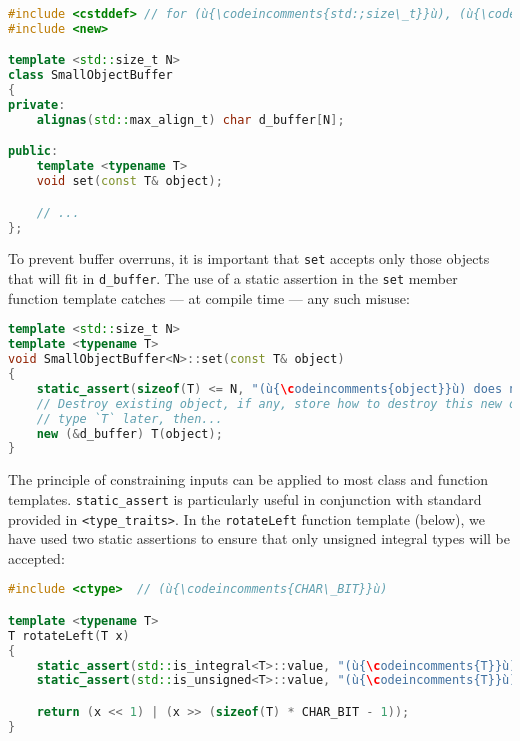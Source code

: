 %
%
\begin{lstlisting}[language=C++]
#include <cstddef> // for (ù{\codeincomments{std:;size\_t}}ù), (ù{\codeincomments{std::max\_align\_t}}ù)
#include <new>

template <std::size_t N>
class SmallObjectBuffer
{
private:
    alignas(std::max_align_t) char d_buffer[N];

public:
    template <typename T>
    void set(const T& object);

    // ...
};
\end{lstlisting}

    
\noindent To prevent buffer overruns, it is important that \lstinline!set! accepts
only those objects that will fit in \lstinline!d_buffer!. The use of a
static assertion in the \lstinline!set! member function template catches
--- at compile time --- any such misuse:

\begin{lstlisting}[language=C++]
template <std::size_t N>
template <typename T>
void SmallObjectBuffer<N>::set(const T& object)
{
    static_assert(sizeof(T) <= N, "(ù{\codeincomments{object}}ù) does not fit in the small buffer.");
    // Destroy existing object, if any, store how to destroy this new object of
    // type `T` later, then...
    new (&d_buffer) T(object);
}
\end{lstlisting}

    

The principle of constraining inputs can be applied to most class and
function templates. \lstinline!static_assert! is particularly useful in
conjunction with standard  provided in
\lstinline!<type_traits>!. In the \lstinline!rotateLeft! function template
(below), we have used two static assertions to ensure that only unsigned
integral types will be accepted:

\begin{lstlisting}[language=C++]
#include <ctype>  // (ù{\codeincomments{CHAR\_BIT}}ù)

template <typename T>
T rotateLeft(T x)
{
    static_assert(std::is_integral<T>::value, "(ù{\codeincomments{T}}ù) must be an integral type.");
    static_assert(std::is_unsigned<T>::value, "(ù{\codeincomments{T}}ù) must be an unsigned type.");

    return (x << 1) | (x >> (sizeof(T) * CHAR_BIT - 1));
}
\end{lstlisting}
    

